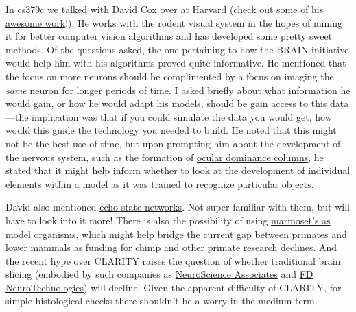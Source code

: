		In \href{http://www.stanford.edu/class/cs379c/}{cs379c} we talked with \href{http://www.coxlab.org/}{David Cox} over at Harvard (check out some of his \href{http://www.coxlab.org/projects/subprojects/advanced\_electrode\_positioning/}{awesome work}!). He works with the rodent visual system in the hopes of mining it for better computer vision algorithms and has developed some pretty sweet methods. Of the questions asked, the one pertaining to how the BRAIN initiative would help him with his algorithms proved quite informative. He mentioned that the focus on more neurons should be complimented by a focus on imaging the \emph{same} neuron for longer periods of time. I asked briefly about what information he would gain,
		or how he would adapt his models, should be gain access to this data---the implication was that if you could simulate the data you would get, how would this guide the technology you needed to build. He noted that this might not be the best use of time, but upon prompting him about the development of the nervous system, such as the formation of \href{http://en.wikipedia.org/wiki/Ocular\_dominance\_column}{ocular dominance columns}, he stated that it might help inform whether to look at the development of individual elements within a model as it was trained to recognize particular objects.


		David also mentioned \href{http://en.wikipedia.org/wiki/Echo\_state\_network}{echo state networks}. Not super familiar with them, but will have to look into it more! There is also the possibility of using \href{http://www.nature.com/news/2009/090527/full/459492a.html}{marmoset's as model organisms}, which might help bridge the current gap between primates and lower mammals as funding for chimp and other primate research declines. And the recent hype over CLARITY\citep{chung2013structural} raises the question of whether traditional brain slicing (embodied by such companies as \href{http://www.neuroscienceassociates.com/}{NeuroScience Associates}
		and \href{http://fdneurotech.com/}{FD NeuroTechnologies}) will decline.
		Given the apparent difficulty of CLARITY, for simple histological checks there shouldn't be a worry in the medium-term.


